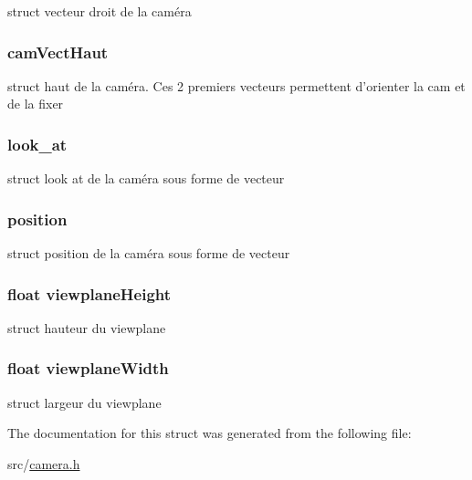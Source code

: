 \label{structcamera__new_ab3a4002e1ae75a9133367b3dda70ee14}
struct vecteur droit de la caméra \hypertarget{structcamera__new_a507bea91a4e3c76be59cec90cd2f9937}{
\subsubsection[{camVectHaut}]{ {\bf camVectHaut}}}
\label{structcamera__new_a507bea91a4e3c76be59cec90cd2f9937}
struct haut de la caméra. Ces 2 premiers vecteurs permettent d'orienter la cam et de la fixer \hypertarget{structcamera__new_ad7647430b05d8095b7d29aa66b7bfb1a}{
\subsubsection[{look\_\-at}]{ {\bf look\_\-at}}}
\label{structcamera__new_ad7647430b05d8095b7d29aa66b7bfb1a}
struct look at de la caméra sous forme de vecteur \hypertarget{structcamera__new_ae5fd54bf7be876724364bedfe8624307}{
\subsubsection[{position}]{ {\bf position}}}
\label{structcamera__new_ae5fd54bf7be876724364bedfe8624307}
struct position de la caméra sous forme de vecteur \hypertarget{structcamera__new_af0d7fe0f1f6fbd0fe663b08e654f2003}{
\subsubsection[{viewplaneHeight}]{\setlength{\rightskip}{0pt plus 5cm}float {\bf viewplaneHeight}}}
\label{structcamera__new_af0d7fe0f1f6fbd0fe663b08e654f2003}
struct hauteur du viewplane \hypertarget{structcamera__new_ade7aec9f255cba52f6e841ba18090507}{
\subsubsection[{viewplaneWidth}]{\setlength{\rightskip}{0pt plus 5cm}float {\bf viewplaneWidth}}}
\label{structcamera__new_ade7aec9f255cba52f6e841ba18090507}
struct largeur du viewplane 

The documentation for this struct was generated from the following file:\begin{DoxyCompactItemize}
\item 
src/\hyperlink{camera_8h}{camera.h}\end{DoxyCompactItemize}
